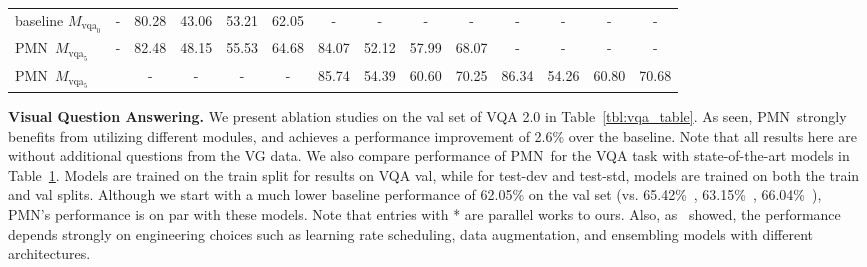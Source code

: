 \documentclass{article}
\makeatletter
\newcommand{\cmark}{{\color{ForestGreen}\ding{51}}}
\newcommand{\SK}[1]{{\color{NavyBlue}{[@Seung: #1]}}}
\def\PMN{PMN}
\newcommand{\rMvqa}[1]{M_{\mathrm{vqa}_{#1}}}
\makeatother
\begin{document}
\begin{table}[t!]
\begin{center}
\begin{small}
{\begin{tabular}{lc|cccc|cccc|cccc}
\midrule
baseline $\rMvqa{0}$                      & -       & 80.28 & 43.06 & 53.21 & 62.05    &  -     & -     & -     & -    & -     & -     & -     & -  \\
\PMN~$\rMvqa{5}$                          & -       & 82.48 & 48.15 & 55.53 & 64.68    & 84.07 & 52.12 & 57.99 & 68.07 & -     & -     & -     & -  \\
\PMN~$\rMvqa{5}$                          & \cmark  & -     & -     & -     & -        & 85.74 & 54.39 & 60.60 & 70.25 & 86.34 & 54.26 & 60.80 & 70.68 \\
\bottomrule
\end{tabular}
}
\end{small}

\label{tbl:vqa_compare}
\end{center}
\vspace{-3.5mm}
\end{table}\textbf{Visual Question Answering.}\hspace{2mm}
We present ablation studies on the val set of VQA 2.0 in Table~\ref{tbl:vqa_table}.
As seen, \PMN~strongly benefits from utilizing different modules, and achieves a performance improvement of 2.6\% over the baseline.
Note that all results here are without additional questions from the VG data.
We also compare performance of \PMN~for the VQA task with state-of-the-art models in Table~\ref{tbl:vqa_compare}.
Models are trained on the train split for results on VQA val, while for test-dev and test-std, models are trained on both the train and val splits.
Although we start with a much lower baseline performance of 62.05\% on the val set (vs. 65.42\%~\citep{zhang18}, 63.15\%~\citep{teney17}, 66.04\%~\citep{kim2018bilinear}), \PMN's performance is on par with these models.
Note that entries with * are parallel works to ours.
Also, as~\cite{jiang2018pythia} showed, the performance depends strongly on engineering choices such as learning rate scheduling, data augmentation, and ensembling models with different architectures.
\end{document}
